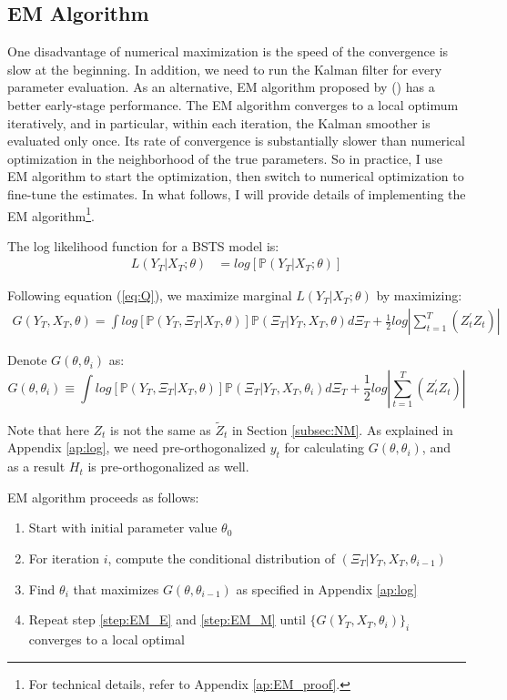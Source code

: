 \documentclass[10pt, titlepage]{article}
\newenvironment{boenumerate}
    {\begin{enumerate}\renewcommand\labelenumi{\textbf\theenumi}}
    {\end{enumerate}}
\numberwithin{equation}{section}
\begin{document}
\subsection{EM Algorithm} \label{subsec:EM}
One disadvantage of numerical maximization is the speed of the convergence is slow at the beginning. In addition, we need to run the Kalman filter for every parameter evaluation. As an alternative, EM algorithm proposed by (\cite{shumway_stoffer_1982}) has a better early-stage performance. The EM algorithm converges to a local optimum iteratively, and in particular, within each iteration, the Kalman smoother is evaluated only once. Its rate of convergence is substantially slower than numerical optimization in the neighborhood of the true parameters. So in practice, I use EM algorithm to start the optimization, then switch to numerical optimization to fine-tune the estimates. In what follows, I will provide details of implementing the EM algorithm\footnote{For technical details, refer to Appendix \ref{ap:EM_proof}.}.  

The log likelihood function for a BSTS model is:
\begin{align*}
    L(Y_T|X_T; \theta) &= log[\mathbb{P}(Y_T|X_T;\theta)]
\end{align*}

Following equation (\ref{eq:Q}), we maximize marginal $L(Y_T|X_T;\theta)$ by maximizing: 
\begin{align*}
    G(Y_T,X_T,\theta) = \int log[\mathbb{P}(Y_T,\Xi_T|X_T,\theta)]\mathbb{P}(\Xi_T|Y_T,X_T,\theta)d\Xi_T + \frac{1}{2}log\left|\sum_{t=1}^{T}(Z_t^{'}Z_t)\right| 
\end{align*}

Denote $G(\theta,\theta_i)$ as: 
\[
    G(\theta,\theta_i) \equiv \int log[\mathbb{P}(Y_T,\Xi_T|X_T,\theta)]\mathbb{P}(\Xi_T|Y_T,X_T,\theta_i)d\Xi_T + \frac{1}{2}log\left|\sum_{t=1}^{T}(Z_t^{'}Z_t)\right| 
\]

Note that here $Z_t$ is not the same as $\tilde{Z}_t$ in Section \ref{subsec:NM}. As explained in Appendix \ref{ap:log}, we need pre-orthogonalized $y_t$ for calculating $G(\theta,\theta_i)$, and as a result $H_t$ is pre-orthogonalized as well. 

EM algorithm proceeds as follows:
\begin{boenumerate}
    \item Start with initial parameter value $\theta_0$
    \item \label{step:EM_E} For iteration $i$, compute the conditional distribution of $(\Xi_T|Y_T,X_T,\theta_{i-1})$
    \item \label{step:EM_M} Find $\theta_{i}$ that maximizes $G(\theta,\theta_{i-1})$ as specified in Appendix \ref{ap:log} 
    \item Repeat step \ref{step:EM_E} and \ref{step:EM_M} until $\{G(Y_T,X_T,\theta_i)\}_i$ converges to a local optimal
\end{boenumerate}
\end{document}
